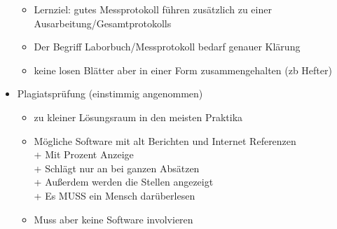 \begin{itemize}
\begin{itemize}
          \item Lernziel: gutes Messprotokoll führen zusätzlich zu einer Ausarbeitung/Gesamtprotokolls
          \item Der Begriff Laborbuch/Messprotokoll bedarf genauer Klärung
          \item keine losen Blätter aber in einer Form zusammengehalten (zb Hefter)
        \end{itemize}
      \item Plagiatsprüfung (einstimmig angenommen)
        \begin{itemize}
          \item zu kleiner Lösungsraum in den meisten Praktika
          \item Mögliche Software mit alt Berichten und Internet Referenzen \\
              + Mit Prozent Anzeige \\
              + Schlägt nur an bei ganzen Absätzen \\
              + Außerdem werden die Stellen angezeigt \\
              + Es MUSS ein Mensch darüberlesen
          \item Muss aber keine Software involvieren
        \end{itemize}
    \end{itemize}
